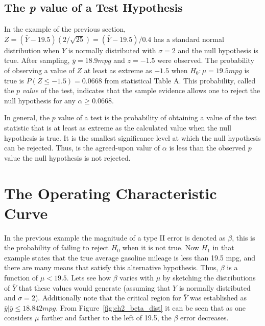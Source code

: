 \documentclass{WileySev}
\begin{document}
\subsection{The \textit{p} value of a Test Hypothesis}

In the example of the previous section, $Z = (\bar{Y}-19.5)(2/\sqrt{25}) = (\bar{Y}-19.5)/0.4$ has a standard normal distribution when $Y$ is normally distributed with $\sigma = 2$ and the null hypothesis is true. After sampling, $\bar{y}=18.9 mpg$ and $z=-1.5$ were observed. The probability of observing a value of $Z$ at least as extreme as $-1.5$ when $H_0:\mu=19.5 mpg$ is true is $P(Z\leq-1.5)=0.0668$ from statistical Table A. This probability, called the $p$ \textit{value} of the test, indicates that the sample evidence allows one to reject the null hypothesis for any $\alpha\geq 0.0668$.

In general, the $p$ value of a test is the probability of obtaining a value of the test statistic that is at least as extreme as the calculated value when the null hypothesis is true. It is the smallest significance level at which the null hypothesis can be rejected. Thus, is the agreed-upon valur of $\alpha$ is less than the observed $p$ value the null hypothesis is not rejected.

\section{The Operating Characteristic Curve}
In the previous example the magnitude of a type II error is denoted as $\beta$, this is the probability of failing to reject $H_0$ when it is not true. Now $H_1$ in that example states that the true average gasoline mileage is less than 19.5 mpg, and there are many means that satisfy this alternative hypothesis. Thus, $\beta$ is a function of $\mu < 19.5$. Lets see how $\beta$ varies with $\mu$ by sketching the distributions of $\bar{Y}$ that these values would generate (assuming that $Y$ is normally distributed and $\sigma = 2$). Additionally note that the critical region for $\bar{Y}$ was established as ${\bar{y}|\bar{y} \leq 18.842 mpg}$.
From Figure~\ref{fig:ch2_beta_dist} it can be seen that as one considers $\mu$ farther and farther to the left of 19.5, the $\beta$ error decreases.
\end{document}
